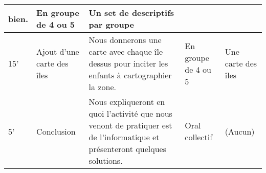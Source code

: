 \documentclass[a4paper,11pt]{article}%
\begin{document}
\begin{center}
\begin{tabular}{|l|p{5.5em}|p{15em}|p{6em}|p{6em}|}
    bien.
  & En groupe de 4 ou 5
  & Un set de descriptifs par groupe
  \\
  \hline
  15'
  & Ajout d'une carte des îles
  & \par Nous donnerons une carte avec chaque île dessus pour inciter les 
    enfants à cartographier la zone. 
  & En groupe de 4 ou 5
  & Une carte des îles
  \\
  \hline
  5'
  & Conclusion
  & Nous expliqueront en quoi l'activité que nous venont de pratiquer est de 
    l'informatique et présenteront quelques solutions.
  & Oral collectif
  & (Aucun)
  \\
  \hline
\end{tabular}
\end{center}
\end{document}
